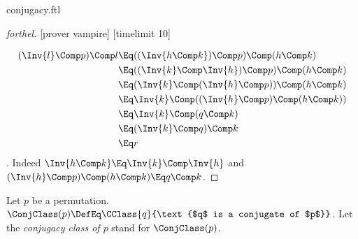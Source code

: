 \documentclass{stex}
\begin{document}
\begin{smodule}{conjugacy.ftl}
\begin{proof}[forthel]
    [prover vampire]
    [timelimit 10]

    \begin{align*}
            (\Inv{l} \Comp p) \Comp l
      &\Eq  ((\Inv{h \Comp k}) \Comp p) \Comp (h \Comp k) \\
      &\Eq  ((\Inv{k} \Comp \Inv{h}) \Comp p) \Comp (h \Comp k) \\
      &\Eq  (\Inv{k} \Comp (\Inv{h} \Comp p)) \Comp (h \Comp k) \\
      &\Eq  \Inv{k} \Comp ((\Inv{h} \Comp p) \Comp (h \Comp k)) \\
      &\Eq  \Inv{k} \Comp (q \Comp k) \\
      &\Eq  (\Inv{k} \Comp q) \Comp k \\
      &\Eq  r
    \end{align*}.
    Indeed $\Inv{h \Comp k} \Eq \Inv{k} \Comp \Inv{h}$ and $(\Inv{h} \Comp p) \Comp (h \Comp k) \Eq q \Comp k$.
  \end{proof}


  \begin{definition}[forthel,for=conjugacy class]
    Let $p$ be a permutation.
    $\ConjClass(p) \DefEq \CClass{q}{\text{$q$ is a conjugate of $p$}}$.
    Let the \emph{conjugacy class of $p$} stand for $\ConjClass(p)$.
  \end{definition}
\end{smodule}
\end{document}
